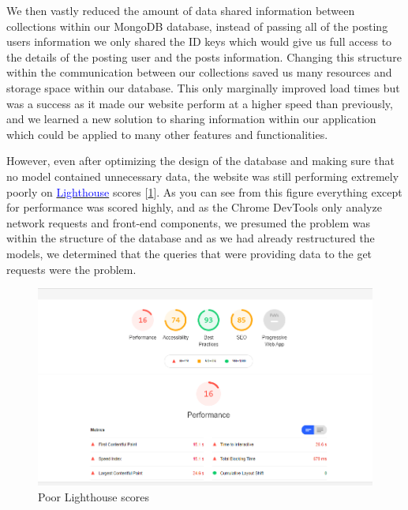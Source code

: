 We then vastly reduced the amount of data shared information between collections within our MongoDB database, instead of passing all of the posting users information we only shared the ID keys which would give us full access to the details of the posting user and the posts information.
Changing this structure within the communication between our collections saved us many resources and storage space within our database. This only marginally improved load times but was a success as it made our website perform at a higher speed than previously, and we learned a new solution to sharing information within our application which could be applied to many other features and functionalities.
\newline

However, even after optimizing the design of the database and making sure that no model contained unnecessary data, the website was still performing extremely poorly on \href{https://developers.google.com/web/tools/lighthouse/}{\textcolor{blue}{Lighthouse}} scores [\ref{fig:poor_lighthouse}]. As you can see from this figure everything except for performance was scored highly, and as the Chrome DevTools only analyze network requests and front-end components, we presumed the problem was within the structure of the database and as we had already restructured the models, we determined that the queries that were providing data to the get requests were the problem.

\begin{figure}[H]
  \centering
  \includegraphics[scale=0.65]{img/lighthouse_poor_cropped.jpg}
  \caption{Poor Lighthouse scores}
  \label{fig:poor_lighthouse}
\end{figure}

